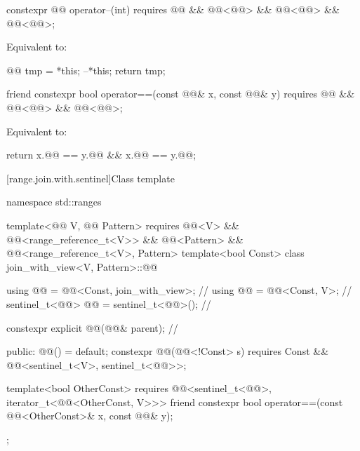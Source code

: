 \begin{itemdecl}
constexpr @@ operator--(int)
  requires @@ && @@<@@> &&
           @@<@@> && @@<@@>;
\end{itemdecl}

\begin{itemdescr}
\pnum
\effects
Equivalent to:
\begin{codeblock}
@@ tmp = *this;
--*this;
return tmp;
\end{codeblock}
\end{itemdescr}

\begin{itemdecl}
friend constexpr bool operator==(const @@& x, const @@& y)
  requires @@ && @@<@@> &&
           @@<@@>;
\end{itemdecl}

\begin{itemdescr}
\pnum
\effects
Equivalent to:
\begin{codeblock}
return x.@@ == y.@@ && x.@@ == y.@@;
\end{codeblock}
\end{itemdescr}

[range.join.with.sentinel]{Class template }

\begin{codeblock}
namespace std::ranges {
  template<@@ V, @@ Pattern>
    requires @@<V> && @@<range_reference_t<V>>
          && @@<Pattern> && @@<range_reference_t<V>, Pattern>
  template<bool Const>
  class join_with_view<V, Pattern>::@@ {
    using @@ = @@<Const, join_with_view>;  // \expos
    using @@ = @@<Const, V>;                 // \expos
    sentinel_t<@@> @@ = sentinel_t<@@>();         // \expos

    constexpr explicit @@(@@& parent);        // \expos

  public:
    @@() = default;
    constexpr @@(@@<!Const> s)
      requires Const && @@<sentinel_t<V>, sentinel_t<@@>>;

    template<bool OtherConst>
      requires @@<sentinel_t<@@>, iterator_t<@@<OtherConst, V>>>
    friend constexpr bool operator==(const @@<OtherConst>& x, const @@& y);
  };
}
\end{codeblock}

